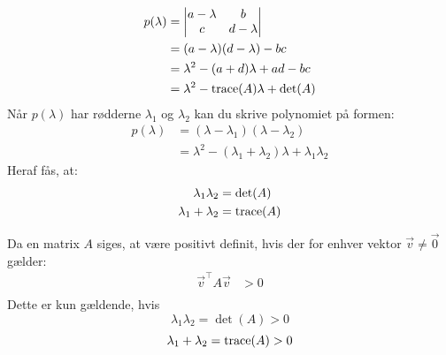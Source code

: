 \begin{align*}
    p(\lambda)&=\begin{vmatrix}
a-\lambda & b \\
c & d-\lambda
\end{vmatrix}\\
&= (a-\lambda)(d-\lambda)-bc\\
&= \lambda^2-(a+d)\lambda+ad-bc\\
&= \lambda^2-\textnormal{trace}(A)\lambda+\det (A)
\end{align*}
Når $p(\lambda)$ har rødderne $\lambda_1$ og $\lambda_2$ kan du skrive polynomiet på formen:
\begin{align*}
    p(\lambda)&=(\lambda-\lambda_1)(\lambda-\lambda_2)\\
    &=\lambda^2-(\lambda_1+\lambda_2)\lambda+\lambda_1\lambda_2
\end{align*}
Heraf fås, at:
\begin{align*}
   \lambda_1\lambda_2 &=\det (A) \\
   \lambda_1+\lambda_2 &= \textnormal{trace}(A)
\end{align*}


Da en matrix $A$ siges, at være positivt definit, hvis der for enhver vektor $\vec{v}\neq \vec{0}$ gælder:
\begin{align*}
    \vec{v}^{\top}A\vec{v}&>0\\
\end{align*}
Dette er kun gældende, hvis
\begin{equation} \label{det10}
    \lambda_1\lambda_2 =\det (A) >0
\end{equation}
\begin{equation} \label{trace}
    \lambda_1+\lambda_2 =\textnormal{trace}(A)>0
\end{equation}

